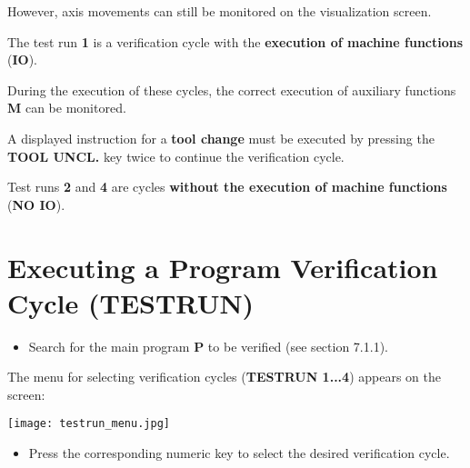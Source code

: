 However, axis movements can still be monitored on the visualization screen.

The test run \textbf{1} is a verification cycle with the \textbf{execution of machine functions} (\textbf{IO}).

During the execution of these cycles, the correct execution of auxiliary functions \textbf{M} can be monitored.

A displayed instruction for a \textbf{tool change} must be executed by pressing the \textbf{TOOL UNCL.} key twice to continue the verification cycle.


Test runs \textbf{2} and \textbf{4} are cycles \textbf{without the execution of machine functions} (\textbf{NO IO}).

\newpage
\section{Executing a Program Verification Cycle (TESTRUN)}

\begin{itemize}
    \item Search for the main program \textbf{P} to be verified (see section 7.1.1).
\end{itemize}

\begin{itemize}
\end{itemize}

\vspace{.5cm}

\begin{itemize}
\end{itemize}

\vspace{.5cm}

The menu for selecting verification cycles (\textbf{TESTRUN 1...4}) appears on the screen:

\begin{center}
    \texttt{[image: testrun\_menu.jpg]}
\end{center}

\begin{itemize}
    \item Press the corresponding numeric key to select the desired verification cycle.
\end{itemize}

